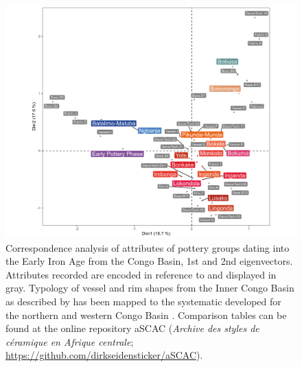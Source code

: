 \begin{reviewer}
\begin{figure}[!tb]
	\includegraphics[width=\textwidth]{fig/varia_potterystyles_eia_attributes_ca.jpg}
	\caption{Correspondence analysis of attributes of pottery groups dating into the Early Iron Age from the Congo Basin, 1st and 2nd eigenvectors. Attributes recorded are encoded in reference to \citet[30 Fig.~5: vessel types; 32 Fig.~8: shape of the rims; 33 Fig.~9: shape of the base; 36--38 Tab.~7: decoration technique; 62--65 Tab.~11: fabrics]{Seidensticker.2021e} and displayed in gray. Typology of vessel and rim shapes from the Inner Congo Basin as described by \citet{Wotzka.1995} has been mapped to the systematic developed for the northern and western Congo Basin \citep[30 Fig.~5: vessel types; 32 Fig.~8: shape of the rims]{Seidensticker.2021e}. Comparison tables can be found at the online repository aSCAC (\textit{Archive des styles de céramique en Afrique centrale}; \url{https://github.com/dirkseidensticker/aSCAC}).}
	\label{fig:potterystyles_eia_attributes_ca}
\end{figure}


\end{reviewer}
